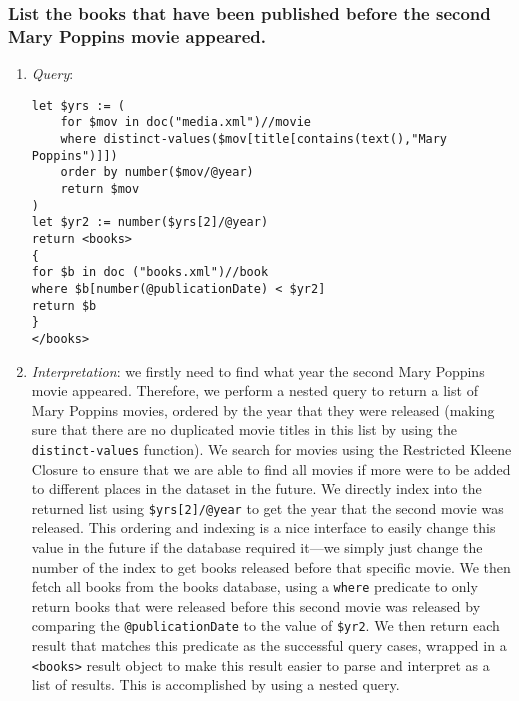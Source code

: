 \documentclass[11pt]{article}
\begin{document}
\begin{enumerate}
\end{enumerate}

\subsubsection{List the books that have been published before the second Mary Poppins movie appeared.}

\begin{enumerate}
\item \textit{Query}:
\begin{small}
\begin{verbatim}
let $yrs := (
    for $mov in doc("media.xml")//movie
    where distinct-values($mov[title[contains(text(),"Mary Poppins")]])
    order by number($mov/@year) 
    return $mov
) 
let $yr2 := number($yrs[2]/@year)
return <books>
{
for $b in doc ("books.xml")//book 
where $b[number(@publicationDate) < $yr2] 
return $b
}
</books>
\end{verbatim}
\end{small}
\item \textit{Interpretation}: we firstly need to find what year the second Mary Poppins movie appeared. Therefore, we perform a nested query to return a list of Mary Poppins movies, ordered by the year that they were released (making sure that there are no duplicated movie titles in this list by using the \texttt{distinct-values} function). We search for movies using the Restricted Kleene Closure to ensure that we are able to find all movies if more were to be added to different places in the dataset in the future. We directly index into the returned list using \texttt{\$yrs[2]/@year} to get the year that the second movie was released. This ordering and indexing is a nice interface to easily change this value in the future if the database required it---we simply just change the number of the index to get books released before that specific movie. We then fetch all books from the books database, using a \texttt{where} predicate to only return books that were released before this second movie was released by comparing the \texttt{@publicationDate} to the value of \texttt{\$yr2}. We then return each result that matches this predicate as the successful query cases, wrapped in a \texttt{<books>} result object to make this result easier to parse and interpret as a list of results. This is accomplished by using a nested query.


\end{enumerate}
\end{document}
